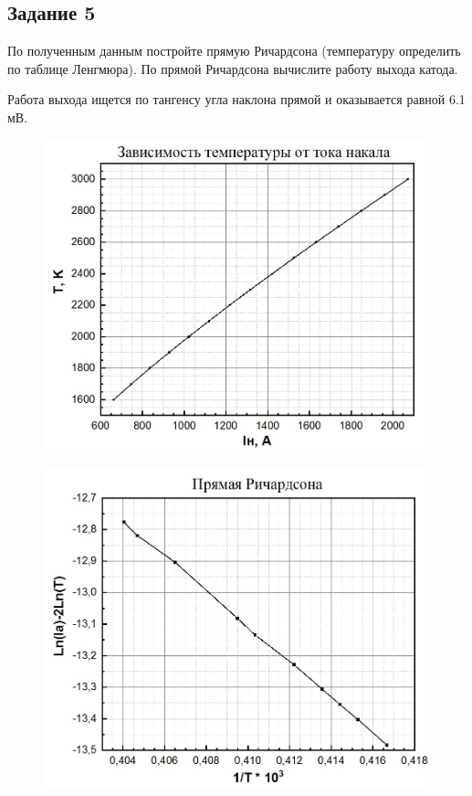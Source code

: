 \subsection{Задание 5}
По полученным данным постройте прямую Ричардсона (температуру определить по таблице Ленгмюра). По прямой Ричардсона вычислите работу выхода катода.

Работа выхода ищется по тангенсу угла наклона прямой и оказывается равной 6.1 мВ.

\begin{figure}[H]
	\centering
	\includegraphics[width=0.75\linewidth]{fig/z5.jpg}
	\caption{}
	\label{fig:19}
\end{figure}

\begin{figure}[H]
	\centering
	\includegraphics[width=0.75\linewidth]{fig/z51.jpg}
	\caption{}
	\label{fig:20}
\end{figure}

